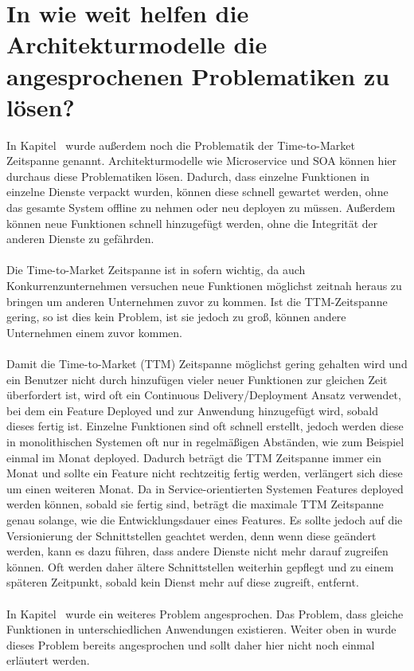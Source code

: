 \section{In wie weit helfen die Architekturmodelle die angesprochenen Problematiken zu lösen?}
\label{sec:LoesungDerProblematiken}
In Kapitel \ wurde außerdem noch die Problematik der Time-to-Market Zeitspanne genannt. Architekturmodelle wie Microservice und SOA können hier durchaus diese Problematiken lösen. Dadurch, dass einzelne Funktionen in einzelne Dienste verpackt wurden, können diese schnell gewartet werden, ohne das gesamte System offline zu nehmen oder neu deployen zu müssen. Außerdem können neue Funktionen schnell hinzugefügt werden, ohne die Integrität der anderen Dienste zu gefährden.
\\\\
Die Time-to-Market Zeitspanne ist in sofern wichtig, da auch Konkurrenzunternehmen versuchen neue Funktionen möglichst zeitnah heraus zu bringen um anderen Unternehmen zuvor zu kommen. Ist die TTM-Zeitspanne gering, so ist dies kein Problem, ist sie jedoch zu groß, können andere Unternehmen einem zuvor kommen.
\\\\
Damit die Time-to-Market (TTM) Zeitspanne möglichst gering gehalten wird und ein Benutzer nicht durch hinzufügen vieler neuer Funktionen zur gleichen Zeit überfordert ist, wird oft ein Continuous Delivery/Deployment Ansatz verwendet, bei dem ein Feature Deployed und zur Anwendung hinzugefügt wird, sobald dieses fertig ist. Einzelne Funktionen sind oft schnell erstellt, jedoch werden diese in monolithischen Systemen oft nur in regelmäßigen Abständen, wie zum Beispiel einmal im Monat deployed. Dadurch beträgt die TTM Zeitspanne immer ein Monat und sollte ein Feature nicht rechtzeitig fertig werden, verlängert sich diese um einen weiteren Monat. Da in Service-orientierten Systemen Features deployed werden können, sobald sie fertig sind, beträgt die maximale TTM Zeitspanne genau solange, wie die Entwicklungsdauer eines Features. Es sollte jedoch auf die Versionierung der Schnittstellen geachtet werden, denn wenn diese geändert werden, kann es dazu führen, dass andere Dienste nicht mehr darauf zugreifen können. Oft werden daher ältere Schnittstellen weiterhin gepflegt und zu einem späteren Zeitpunkt, sobald kein Dienst mehr auf diese zugreift, entfernt.
\\\\
In Kapitel \ wurde ein weiteres Problem angesprochen. Das Problem, dass gleiche Funktionen in unterschiedlichen Anwendungen existieren. Weiter oben in  wurde dieses Problem bereits angesprochen und sollt daher hier nicht noch einmal erläutert werden.

